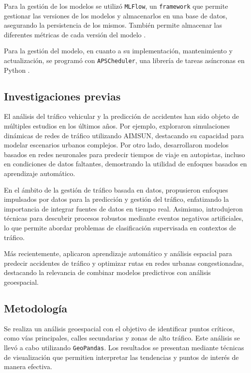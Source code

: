 \documentclass[12pt]{article}
\begin{document}
Para la gestión de los modelos se utilizó \texttt{MLFlow}, un \texttt{framework} que permite gestionar las versiones de los modelos y almacenarlos en una base de datos, asegurando la persistencia de los mismos. También permite almacenar las diferentes métricas de cada versión del modelo \citep{mlflow2025}.

Para la gestión del modelo, en cuanto a su implementación, mantenimiento y actualización, se programó con \texttt{APSCheduler}, una librería de tareas asíncronas en Python \citep{apscheduler2025}.

\subsection{Investigaciones previas}

El análisis del tráfico vehicular y la predicción de accidentes han sido objeto de múltiples estudios en los últimos años. Por ejemplo, \citet{barcelo2005} exploraron simulaciones dinámicas de redes de tráfico utilizando AIMSUN, destacando su capacidad para modelar escenarios urbanos complejos. Por otro lado, \citet{vanlint2005} desarrollaron modelos basados en redes neuronales para predecir tiempos de viaje en autopistas, incluso en condiciones de datos faltantes, demostrando la utilidad de enfoques basados en aprendizaje automático.

En el ámbito de la gestión de tráfico basada en datos, \citet{chen2015} propusieron enfoques impulsados por datos para la predicción y gestión del tráfico, enfatizando la importancia de integrar fuentes de datos en tiempo real. Asimismo, \citet{goedertier2009robust} introdujeron técnicas para descubrir procesos robustos mediante eventos negativos artificiales, lo que permite abordar problemas de clasificación supervisada en contextos de tráfico.

Más recientemente, \citet{berhanu2024} aplicaron aprendizaje automático y análisis espacial para predecir accidentes de tráfico y optimizar rutas en redes urbanas congestionadas, destacando la relevancia de combinar modelos predictivos con análisis geoespacial.

\subsection{Metodología}

Se realiza un análisis geoespacial con el objetivo de identificar puntos críticos, como vías principales, calles secundarias y zonas de alto tráfico. Este análisis se llevó a cabo utilizando \texttt{GeoPandas}. Los resultados se presentan mediante técnicas de visualización que permitien interpretar las tendencias y puntos de interés de manera efectiva.
\end{document}
